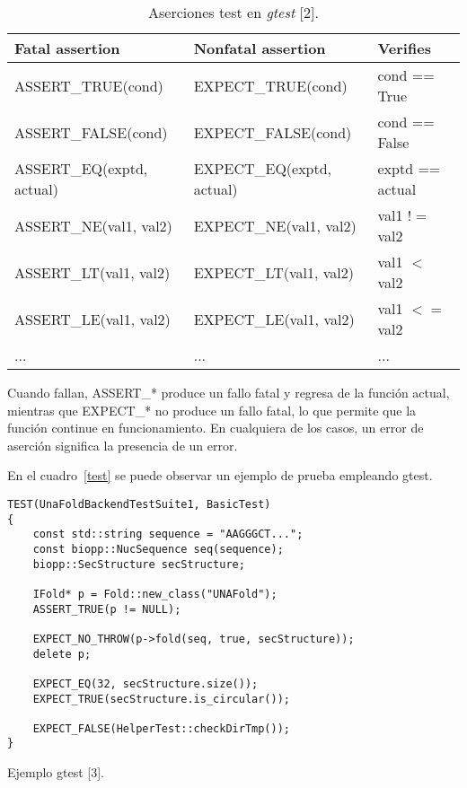 \begin{table}[!hbt]
	\begin{center}
		\begin{tabular}{|l|l|l|}
			\hline
			Fatal assertion & Nonfatal assertion & Verifies \\
			\hline
			ASSERT\_TRUE(cond) & EXPECT\_TRUE(cond) & cond == True\\ \hline
			ASSERT\_FALSE(cond) & EXPECT\_FALSE(cond) & cond == False\\ \hline
			ASSERT\_EQ(exptd, actual) & EXPECT\_EQ(exptd, actual) & exptd == actual\\ \hline
			ASSERT\_NE(val1, val2) &	EXPECT\_NE(val1, val2) &	val1 $!=$ val2\\ \hline
			ASSERT\_LT(val1, val2) &	EXPECT\_LT(val1, val2) & val1 $<$ val2\\ \hline
			ASSERT\_LE(val1, val2) &	EXPECT\_LE(val1, val2) &	val1 $<=$ val2\\ \hline
			... & ... & ...\\ \hline
		\end{tabular}
		\caption{Aserciones test en \emph{gtest} [2].}
		\label{aserciones}
	\end{center}
\end{table}

Cuando fallan, ASSERT\_* produce un fallo fatal y regresa de la función actual, mientras que EXPECT\_* no produce un fallo fatal, lo que permite que la función continue en funcionamiento. En cualquiera de los casos, un error de aserción significa la presencia de un error.

\par En el cuadro~\ref{test} se puede observar un ejemplo de prueba empleando gtest.

\begin{table}[!h]
    \lstset{language=C++}
    \begin{lstlisting}[frame=single]
TEST(UnaFoldBackendTestSuite1, BasicTest)
{
    const std::string sequence = "AAGGGCT...";
    const biopp::NucSequence seq(sequence);
    biopp::SecStructure secStructure;

    IFold* p = Fold::new_class("UNAFold");
    ASSERT_TRUE(p != NULL);

    EXPECT_NO_THROW(p->fold(seq, true, secStructure));
    delete p;

    EXPECT_EQ(32, secStructure.size());
    EXPECT_TRUE(secStructure.is_circular());

    EXPECT_FALSE(HelperTest::checkDirTmp());
}

    \end{lstlisting}
    \centering \caption{Ejemplo gtest [3].}
    \label{test}
\end{table}

